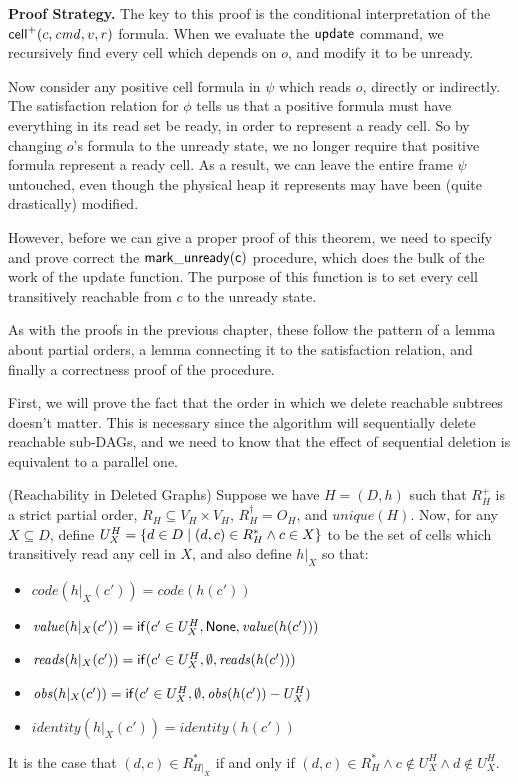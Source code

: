\textbf{Proof Strategy.} The key to this proof is the conditional
interpretation of the $\mathsf{cell}^{+}({c}, {\mathit{cmd}}, {v}, {r})$ formula. When we evaluate
the $\mathsf{update}$ command, we recursively find every cell which
depends on $o$, and modify it to be unready.

Now consider any positive cell formula in $\psi$ which reads $o$,
directly or indirectly. The satisfaction relation for $\phi$ tells us
that a positive formula must have everything in its read set be ready,
in order to represent a ready cell. So by changing $o$'s formula to
the unready state, we no longer require that positive formula
represent a ready cell. As a result, we can leave the entire frame
$\psi$ untouched, even though the physical heap it represents may have
been (quite drastically) modified.

However, before we can give a proper proof of this theorem, we need to
specify and prove correct the $\mathsf{mark\_unready(c)}$ procedure,
which does the bulk of the work of the update function. The purpose of
this function is to set every cell transitively reachable from $c$ to
the unready state.

As with the proofs in the previous chapter, these follow the pattern 
of a lemma about partial orders, a lemma connecting it to the satisfaction
relation, and finally a correctness proof of the procedure. 

First, we will prove the fact that the order in which we delete
reachable subtrees doesn't matter. This is necessary since the 
algorithm will sequentially delete reachable sub-DAGs, and we
need to know that the effect of sequential deletion is equivalent
to a parallel one.  

\begin{lemma}{(Reachability in Deleted Graphs)}
Suppose we have $H = (D,h)$ such that $R^+_H$ is a strict partial
order, $R_H \subseteq V_H \times V_H$, $R^\dagger_H = O_H$, and
$\mathit{unique}(H)$.  Now, for any $X \subseteq D$, define $U^H_X =
\{{{d \in D}\;|\;{(d, c) \in R^*_H \land c \in X}}\}$ to be the set
of cells which transitively read any cell in $X$, and also define
$h|_X$ so that:
\begin{itemize}
\item $\mathit{code}(h|_X(c')) = \mathit{code}(h(c'))$
\item $\mathit{value}(h|_X(c')) = \mathsf{if}({c' \in U^H_X}, {\mathsf{None}}, {\mathit{value}(h(c'))})$
\item $\mathit{reads}(h|_X(c')) = \mathsf{if}({c' \in U^H_X}, {\emptyset}, {\mathit{reads}(h(c'))})$
\item $\mathit{obs}(h|_X(c')) = \mathsf{if}({c' \in U^H_X}, {\emptyset}, {\mathit{obs}(h(c')) - U^H_X})$
\item $\mathit{identity}(h|_X(c')) = \mathit{identity}(h(c'))$
\end{itemize}

It is the case that $(d,c) \in R^*_{H|_X}$ if and only if $(d,c) \in R^*_H \land c \not\in U^H_X \land d \not\in U^H_X$. 
\end{lemma}

